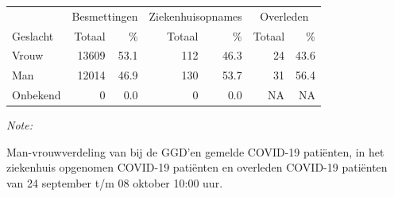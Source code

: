 \documentclass[
  english,
  man,floatsintext]{apa6}
\begin{document}
\begin{table}
\centering\begingroup\fontsize{11}{13}\selectfont

\begin{threeparttable}
\begin{tabular}{lrrrrrr}
\toprule
\multicolumn{1}{c}{ } & \multicolumn{2}{c}{Besmettingen} & \multicolumn{2}{c}{Ziekenhuisopnames} & \multicolumn{2}{c}{Overleden} \\
\cmidrule(l{3pt}r{3pt}){2-3} \cmidrule(l{3pt}r{3pt}){4-5} \cmidrule(l{3pt}r{3pt}){6-7}
Geslacht & Totaal & \% & Totaal & \% & Totaal & \%\\
\midrule
Vrouw & 13609 & 53.1 & 112 & 46.3 & 24 & 43.6\\
Man & 12014 & 46.9 & 130 & 53.7 & 31 & 56.4\\
Onbekend & 0 & 0.0 & 0 & 0.0 & NA & NA\\
\bottomrule
\end{tabular}
\begin{tablenotes}
\item \textit{Note: } 
\item Man-vrouwverdeling van bij de GGD’en gemelde COVID-19 patiënten, in het ziekenhuis opgenomen COVID-19 patiënten en overleden COVID-19 patiënten van 24 september t/m 08 oktober 10:00 uur.
\end{tablenotes}
\end{threeparttable}
\endgroup{}
\end{table}
\newpage
\end{document}
